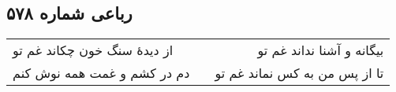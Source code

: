 \begin{center}
\section*{رباعی شماره ۵۷۸}
\label{sec:sh578}
\begin{longtable}{l p{0.5cm} r}
از دیدهٔ سنگ خون چکاند غم تو
&&
بیگانه و آشنا نداند غم تو
\\
دم در کشم و غمت همه نوش کنم
&&
تا از پس من به کس نماند غم تو
\\
\end{longtable}
\end{center}
